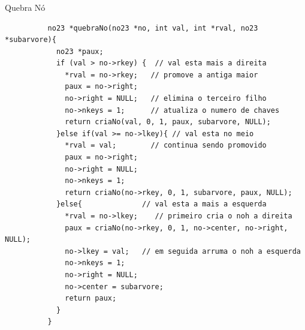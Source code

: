 \documentclass[cyan,compress,aspectratio=43]{beamer}
\begin{document}
\begin{frame}[fragile]
\frametitle{}
      \vspace{-0.2cm}
	\begin{block}{Quebra Nó}
		\begin{lstlisting}
		  no23 *quebraNo(no23 *no, int val, int *rval, no23 *subarvore){
		    no23 *paux;
		    if (val > no->rkey) {  // val esta mais a direita
		      *rval = no->rkey;   // promove a antiga maior
		      paux = no->right;
		      no->right = NULL;   // elimina o terceiro filho
		      no->nkeys = 1;      // atualiza o numero de chaves
		      return criaNo(val, 0, 1, paux, subarvore, NULL);
		    }else if(val >= no->lkey){ // val esta no meio
		      *rval = val;        // continua sendo promovido
		      paux = no->right;
		      no->right = NULL;
		      no->nkeys = 1;
		      return criaNo(no->rkey, 0, 1, subarvore, paux, NULL);
		    }else{              // val esta a mais a esquerda
		      *rval = no->lkey;    // primeiro cria o noh a direita
		      paux = criaNo(no->rkey, 0, 1, no->center, no->right, NULL);
		      no->lkey = val;   // em seguida arruma o noh a esquerda
		      no->nkeys = 1;
		      no->right = NULL;
		      no->center = subarvore;
		      return paux;
		    }
		  }
	  \end{lstlisting}

  	\end{block}
\end{frame}


%		
\end{document}
